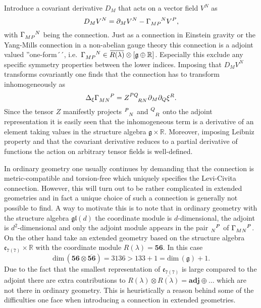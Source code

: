Introduce a covariant derivative $D_M$ that acts on a vector field $V^N$ as  
\begin{equation}
    D_MV^N = \pd_M V^N-\tensor{\Gamma}{_{MP}^N}V^P,
\end{equation}
with $\tensor{\Gamma}{_{MP}^N}$ being the connection. Just as a connection in Einstein gravity or the Yang-Mills connection in a non-abelian gauge theory this connection is a adjoint valued ''one-form´´, i.e.\ $\tensor{\Gamma}{_{MP}^N}\in \overbar{R(\lambda)}\otimes\left[\mathfrak{g}\oplus\mathbb{R}\right]$. Especially this exclude any specific symmetry properties between the lower indices. Imposing that $D_MV^N$ transforms covariantly one finds that the connection has to transform inhomogeneously as 
\begin{equation}\label{eq:InHomoConnection}
    \Delta_\xi \tensor{\Gamma}{_{MN}^P} = \tensor{Z}{^{PQ}_{RN}}\pd_M\pd_Q\xi^R. 
\end{equation}
Since the tensor $Z$ manifestly projects $\tensor{}{^P_N}$ and $\tensor{}{^Q_R}$ onto the adjoint representation it is easily seen that the inhomogeneous term is a derivative of an element taking values in the structure algebra $\mathfrak{g}\times\mathbb{R}$. Moreover, imposing Leibniz property and that the covariant derivative reduces to a partial derivative of functions the action on arbitrary tensor fields is well-defined. 

In ordinary geometry one usually continues by demanding that the connection is metric-compatible and torsion-free which uniquely specifies the Levi-Civita connection. However, this will turn out to be rather complicated in extended geometries and in fact a unique choice of such a connection is generally not possible to find. A way to motivate this is to note that in ordinary geometry with the structure algebra $\mathfrak{gl}(d)$ the coordinate module is $d$-dimensional, the adjoint is $d^2$-dimensional and only the adjoint module appears in the pair $\tensor{}{_N^P}$ of $\tensor{\Gamma}{_{MN}^P}$. On the other hand take an extended geometry based on the structure algebra $\mathfrak{e}_{7(7)}\times\mathbb{R}$ with the coordinate module $R(\lambda)=\mathbf{56}$. In this case 
\begin{equation}
    \text{dim}\, (\mathbf{56}\otimes\overbar{\mathbf{56}}) = 3136 > 133+1 = \text{dim}\, (\mathfrak{g})+1.
\end{equation}
Due to the fact that the smallest representation of $\mathfrak{e}_{7(7)}$ is large compared to the adjoint there are extra contributions to $R(\lambda)\otimes\overbar{R(\lambda)}=\mathbf{adj}\oplus\ldots$ which are not there in ordinary geometry. This is heuristically a reason behind some of the difficulties one face when introducing a connection in extended geometries. 

